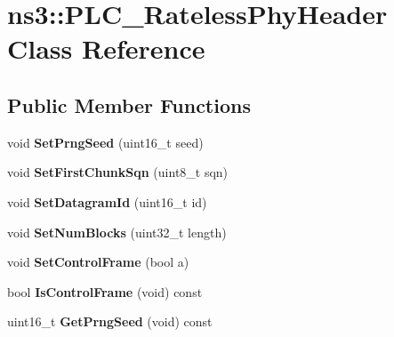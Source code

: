 \hypertarget{classns3_1_1PLC__RatelessPhyHeader}{\section{ns3\-:\-:\-P\-L\-C\-\_\-\-Rateless\-Phy\-Header \-Class \-Reference}
\label{classns3_1_1PLC__RatelessPhyHeader}
}
\subsection*{\-Public \-Member \-Functions}
\begin{DoxyCompactItemize}
\item 
\hypertarget{classns3_1_1PLC__RatelessPhyHeader_affa0d9eeb2bea94bb3c35441e770ab0b}{void {\bfseries \-Set\-Prng\-Seed} (uint16\-\_\-t seed)}\label{classns3_1_1PLC__RatelessPhyHeader_affa0d9eeb2bea94bb3c35441e770ab0b}

\item 
\hypertarget{classns3_1_1PLC__RatelessPhyHeader_acbca1abb47e852fed4005cfd7ff5e26f}{void {\bfseries \-Set\-First\-Chunk\-Sqn} (uint8\-\_\-t sqn)}\label{classns3_1_1PLC__RatelessPhyHeader_acbca1abb47e852fed4005cfd7ff5e26f}

\item 
\hypertarget{classns3_1_1PLC__RatelessPhyHeader_a47e575284ad18bb872b15bf3d5750177}{void {\bfseries \-Set\-Datagram\-Id} (uint16\-\_\-t id)}\label{classns3_1_1PLC__RatelessPhyHeader_a47e575284ad18bb872b15bf3d5750177}

\item 
\hypertarget{classns3_1_1PLC__RatelessPhyHeader_a223f19abce53749f92e3b7d73561c466}{void {\bfseries \-Set\-Num\-Blocks} (uint32\-\_\-t length)}\label{classns3_1_1PLC__RatelessPhyHeader_a223f19abce53749f92e3b7d73561c466}

\item 
\hypertarget{classns3_1_1PLC__RatelessPhyHeader_afb54c38f6528c792be725acc86d91451}{void {\bfseries \-Set\-Control\-Frame} (bool a)}\label{classns3_1_1PLC__RatelessPhyHeader_afb54c38f6528c792be725acc86d91451}

\item 
\hypertarget{classns3_1_1PLC__RatelessPhyHeader_acbccebfbefdc56024052b6eff1a8e725}{bool {\bfseries \-Is\-Control\-Frame} (void) const }\label{classns3_1_1PLC__RatelessPhyHeader_acbccebfbefdc56024052b6eff1a8e725}

\item 
\hypertarget{classns3_1_1PLC__RatelessPhyHeader_a893cd6b06b71c3a7fd1945d65b91e867}{uint16\-\_\-t {\bfseries \-Get\-Prng\-Seed} (void) const }\label{classns3_1_1PLC__RatelessPhyHeader_a893cd6b06b71c3a7fd1945d65b91e867}


\end{DoxyCompactItemize}
